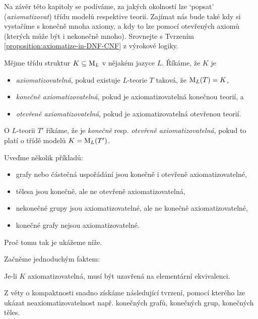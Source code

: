 Na závěr této kapitoly se podíváme, za jakých okolností lze `popsat' (\emph{axiomatizovat}) třídu modelů respektive teorii. Zajímat nás bude také kdy si vystačíme s konečně mnoha axiomy, a kdy to lze pomocí otevřených axiomů (kterých může být i nekonečně mnoho). Srovnejte s Tvrzením \ref{proposition:axiomatize-in-DNF-CNF} z výrokové logiky. 

\begin{definition}[Axiomatizovatelnost]
Mějme třídu struktur $K\subseteq\operatorname{M}_L$ v nějakém jazyce $L$. Říkáme, že $K$ je
\begin{itemize}
    \item \emph{axiomatizovatelná}, pokud existuje $L$-teorie $T$ taková, že $\operatorname{M}_L(T)=K$,
    \item \emph{konečně axiomatizovatelná}, pokud je axiomatizovatelná konečnou teorií, a
    \item \emph{otevřeně axiomatizovatelná}, pokud je axiomatizovatelná otevřenou teorií.
\end{itemize}
O $L$-teorii $T'$ říkáme, že je \emph{konečně} resp. \emph{otevřeně axiomatizovatelná}, pokud to platí o třídě modelů $K=\operatorname{M}_L(T')$.
\end{definition}

\begin{example}
    Uveďme několik příkladů:
    \begin{itemize}
        \item grafy nebo částečná uspořádání jsou konečně i otevřeně axiomatizovatelné,
        \item tělesa jsou konečně, ale ne otevřeně axiomatizovatelná,
        \item nekonečné grupy jsou axiomatizovatelné, ale ne konečně axiomatizovatelné,
        \item konečné grafy nejsou axiomatizovatelné.
    \end{itemize}
    Proč tomu tak je ukážeme níže.
\end{example}

Začněme jednoduchým faktem:

\begin{observation}
    Je-li $K$ axiomatizovatelná, musí být uzavřená na elementární ekvivalenci.  
\end{observation}

Z věty o kompaktnosti snadno získáme následující tvrzení, pomocí kterého lze ukázat neaxiomatizovatelnost např. konečných grafů, konečných grup, konečných těles.

